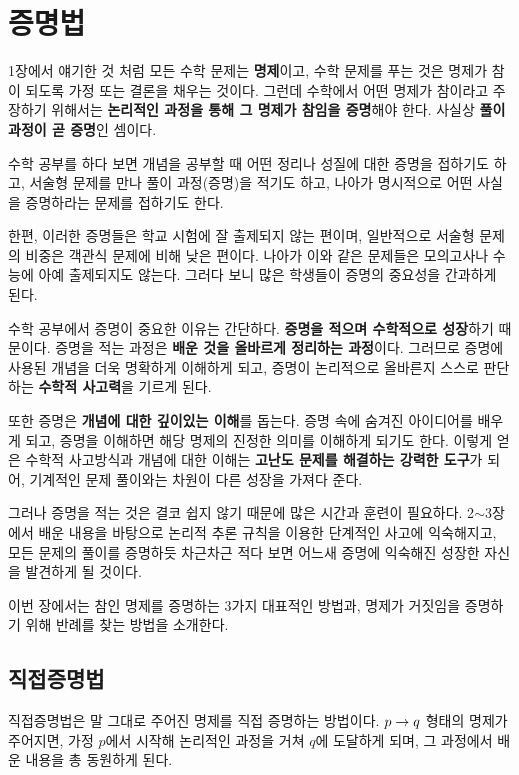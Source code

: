 \chapter{증명법}

1장에서 얘기한 것 처럼 모든 수학 문제는 \textbf{명제}이고, 수학 문제를 푸는 것은 명제가 참이 되도록 가정 또는 결론을 채우는 것이다. 그런데 수학에서 어떤 명제가 참이라고 주장하기 위해서는 \textbf{논리적인 과정을 통해 그 명제가 참임을 증명}해야 한다. 사실상 \textbf{풀이 과정이 곧 증명}인 셈이다.

수학 공부를 하다 보면 개념을 공부할 때 어떤 정리나 성질에 대한 증명을 접하기도 하고, 서술형 문제를 만나 풀이 과정(증명)을 적기도 하고, 나아가 명시적으로 어떤 사실을 증명하라는 문제를 접하기도 한다.

한편, 이러한 증명들은 학교 시험에 잘 출제되지 않는 편이며, 일반적으로 서술형 문제의 비중은 객관식 문제에 비해 낮은 편이다. 나아가 이와 같은 문제들은 모의고사나 수능에 아예 출제되지도 않는다. 그러다 보니 많은 학생들이 증명의 중요성을 간과하게 된다.

수학 공부에서 증명이 중요한 이유는 간단하다. \textbf{증명을 적으며 수학적으로 성장}하기 때문이다. 증명을 적는 과정은 \textbf{배운 것을 올바르게 정리하는 과정}이다. 그러므로 증명에 사용된 개념을 더욱 명확하게 이해하게 되고, 증명이 논리적으로 올바른지 스스로 판단하는 \textbf{수학적 사고력}을 기르게 된다.

또한 증명은 \textbf{개념에 대한 깊이있는 이해}를 돕는다. 증명 속에 숨겨진 아이디어를 배우게 되고, 증명을 이해하면 해당 명제의 진정한 의미를 이해하게 되기도 한다. 이렇게 얻은 수학적 사고방식과 개념에 대한 이해는 \textbf{고난도 문제를 해결하는 강력한 도구}가 되어, 기계적인 문제 풀이와는 차원이 다른 성장을 가져다 준다.

그러나 증명을 적는 것은 결코 쉽지 않기 때문에 많은 시간과 훈련이 필요하다. 2\(\sim\)3장에서 배운 내용을 바탕으로 논리적 추론 규칙을 이용한 단계적인 사고에 익숙해지고, 모든 문제의 풀이를 증명하듯 차근차근 적다 보면 어느새 증명에 익숙해진 성장한 자신을 발견하게 될 것이다.

이번 장에서는 참인 명제를 증명하는 3가지 대표적인 방법과, 명제가 거짓임을 증명하기 위해 반례를 찾는 방법을 소개한다.

\section{직접증명법}

직접증명법은 말 그대로 주어진 명제를 직접 증명하는 방법이다. \(p \rightarrow q\) 형태의 명제가 주어지면, 가정 \(p\)에서 시작해 논리적인 과정을 거쳐 \(q\)에 도달하게 되며, 그 과정에서 배운 내용을 총 동원하게 된다.

